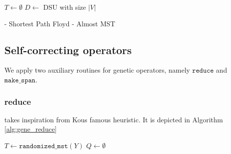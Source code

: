 \documentclass[runningheads]{llncs}
\begin{document}
\begin{algorithm}[htb]
    \caption{$\texttt{almost\_mst}$: Almost Minimum Spanning Tree, modified from Kruskal's} \label{alg:mst}
    $T \gets \emptyset$\;
    $D \gets$ DSU with size $|V|$ 
     {
    }
     {
         {
        }
    }
     {
    }
\end{algorithm}

- Shortest Path Floyd
- Almost MST

\subsection{Self-correcting operators}
We apply two auxiliary routines for genetic operators, namely $\texttt{reduce}$ and $\texttt{make\_span}$.
\subsubsection*{reduce} takes inspiration from Kou\textquotesingle s famous heuristic\cite{kou1981fast}. It is depicted in Algorithm \ref{alg:gene_reduce}

\begin{algorithm}
    \caption{$\texttt{reduce}$: Modified edge trimming heuristic} \label{alg:gene_reduce}
    $T \gets \texttt{randomized\_mst}(Y)$\;
    $Q \gets \emptyset$ 
\end{algorithm}
\end{document}
